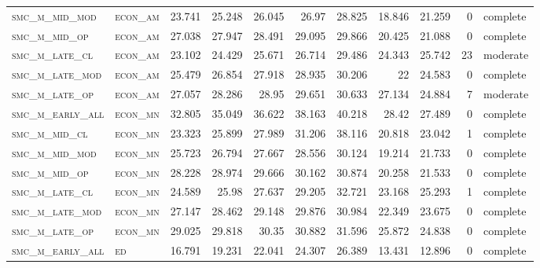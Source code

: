 \begin{landscape}
\begin{center}
\begin{footnotesize}
\begin{longtable}{llrrrrr|rrr}
\textsc{smc\_m\_mid\_mod  } & \textsc{econ\_am  }   & 23.741   & 25.248   & 26.045   & 26.97    & 28.825   & 18.846      & 21.259        & 0             & complete     \\
\textsc{smc\_m\_mid\_op   } & \textsc{econ\_am  }   & 27.038   & 27.947   & 28.491   & 29.095   & 29.866   & 20.425      & 21.088        & 0             & complete     \\
\textsc{smc\_m\_late\_cl  } & \textsc{econ\_am  }   & 23.102   & 24.429   & 25.671   & 26.714   & 29.486   & 24.343      & 25.742        & 23            & moderate \\
\textsc{smc\_m\_late\_mod } & \textsc{econ\_am  }   & 25.479   & 26.854   & 27.918   & 28.935   & 30.206   & 22          & 24.583        & 0             & complete     \\
\textsc{smc\_m\_late\_op  } & \textsc{econ\_am  }   & 27.057   & 28.286   & 28.95    & 29.651   & 30.633   & 27.134      & 24.884        & 7             & moderate \\
\textsc{smc\_m\_early\_all} & \textsc{econ\_mn  }   & 32.805   & 35.049   & 36.622   & 38.163   & 40.218   & 28.42       & 27.489        & 0             & complete     \\
\textsc{smc\_m\_mid\_cl   } & \textsc{econ\_mn  }   & 23.323   & 25.899   & 27.989   & 31.206   & 38.116   & 20.818      & 23.042        & 1             & complete \\
\textsc{smc\_m\_mid\_mod  } & \textsc{econ\_mn  }   & 25.723   & 26.794   & 27.667   & 28.556   & 30.124   & 19.214      & 21.733        & 0             & complete     \\
\textsc{smc\_m\_mid\_op   } & \textsc{econ\_mn  }   & 28.228   & 28.974   & 29.666   & 30.162   & 30.874   & 20.258      & 21.533        & 0             & complete     \\
\textsc{smc\_m\_late\_cl  } & \textsc{econ\_mn  }   & 24.589   & 25.98    & 27.637   & 29.205   & 32.721   & 23.168      & 25.293        & 1             & complete \\
\textsc{smc\_m\_late\_mod } & \textsc{econ\_mn  }   & 27.147   & 28.462   & 29.148   & 29.876   & 30.984   & 22.349      & 23.675        & 0             & complete     \\
\textsc{smc\_m\_late\_op  } & \textsc{econ\_mn  }   & 29.025   & 29.818   & 30.35    & 30.882   & 31.596   & 25.872      & 24.838        & 0             & complete     \\
\textsc{smc\_m\_early\_all} & \textsc{ed        }   & 16.791   & 19.231   & 22.041   & 24.307   & 26.389   & 13.431      & 12.896        & 0             & complete     \\

\end{longtable}
\end{footnotesize}
\end{center}
\end{landscape}
